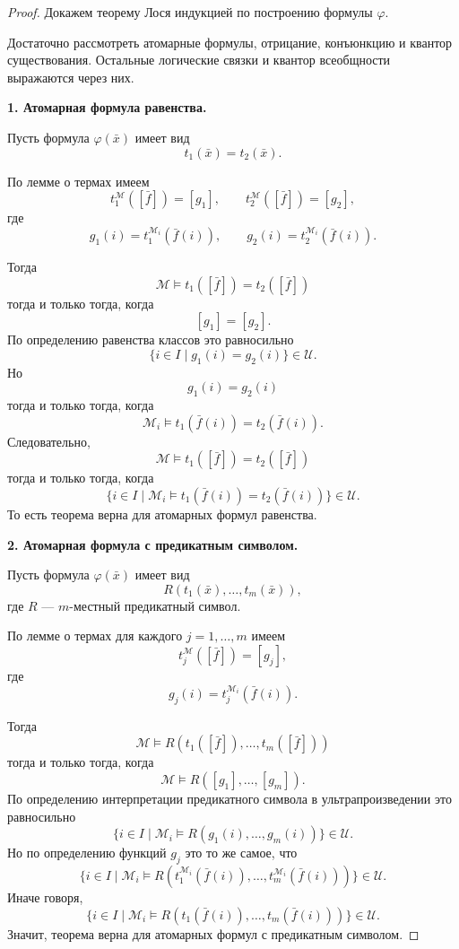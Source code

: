 \documentclass[12pt,a4paper,oneside,openany]{book}
\theoremstyle{definition}
\theoremstyle{plain}
\theoremstyle{remark}
\begin{document}
\begin{proof}
Докажем теорему Лося индукцией по построению формулы $\varphi$.

Достаточно рассмотреть атомарные формулы, отрицание, конъюнкцию и квантор существования. Остальные логические связки и квантор всеобщности выражаются через них.

\medskip

\textbf{1. Атомарная формула равенства.}

Пусть формула $\varphi(\bar x)$ имеет вид
\[
t_1(\bar x)=t_2(\bar x).
\]

По лемме о термах имеем
\[
t_1^{\mathcal M}([\bar f])=[g_1],
\qquad
t_2^{\mathcal M}([\bar f])=[g_2],
\]
где
\[
g_1(i)=t_1^{\mathcal M_i}(\bar f(i)),
\qquad
g_2(i)=t_2^{\mathcal M_i}(\bar f(i)).
\]

Тогда
\[
\mathcal M\models t_1([\bar f])=t_2([\bar f])
\]
тогда и только тогда, когда
\[
[g_1]=[g_2].
\]
По определению равенства классов это равносильно
\[
\{i\in I\mid g_1(i)=g_2(i)\}\in\mathcal U.
\]
Но
\[
g_1(i)=g_2(i)
\]
тогда и только тогда, когда
\[
\mathcal M_i\models
t_1(\bar f(i))=t_2(\bar f(i)).
\]
Следовательно,
\[
\mathcal M\models t_1([\bar f])=t_2([\bar f])
\]
тогда и только тогда, когда
\[
\{i\in I\mid
\mathcal M_i\models
t_1(\bar f(i))=t_2(\bar f(i))
\}\in\mathcal U.
\]
То есть теорема верна для атомарных формул равенства.

\medskip

\textbf{2. Атомарная формула с предикатным символом.}

Пусть формула $\varphi(\bar x)$ имеет вид
\[
R(t_1(\bar x),\ldots,t_m(\bar x)),
\]
где $R$ — $m$-местный предикатный символ.

По лемме о термах для каждого $j=1,\ldots,m$ имеем
\[
t_j^{\mathcal M}([\bar f])=[g_j],
\]
где
\[
g_j(i)=t_j^{\mathcal M_i}(\bar f(i)).
\]

Тогда
\[
\mathcal M\models
R(t_1([\bar f]),\ldots,t_m([\bar f]))
\]
тогда и только тогда, когда
\[
\mathcal M\models R([g_1],\ldots,[g_m]).
\]
По определению интерпретации предикатного символа в ультрапроизведении это равносильно
\[
\{i\in I\mid
\mathcal M_i\models
R(g_1(i),\ldots,g_m(i))
\}\in\mathcal U.
\]
Но по определению функций $g_j$ это то же самое, что
\[
\{i\in I\mid
\mathcal M_i\models
R(t_1^{\mathcal M_i}(\bar f(i)),\ldots,t_m^{\mathcal M_i}(\bar f(i)))
\}\in\mathcal U.
\]
Иначе говоря,
\[
\{i\in I\mid
\mathcal M_i\models
R(t_1(\bar f(i)),\ldots,t_m(\bar f(i)))
\}\in\mathcal U.
\]
Значит, теорема верна для атомарных формул с предикатным символом.


\end{proof}
\end{document}
